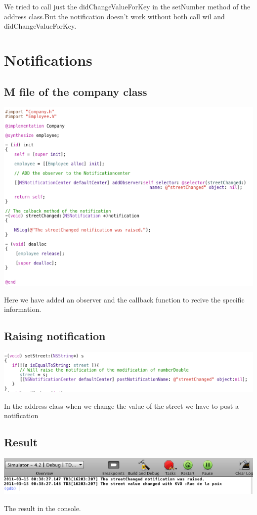 \documentclass[a4paper,10pt]{article}
\begin{document}
			We tried to call just the didChangeValueForKey  in the setNumber method of the  address class.But the notification doesn't work without both call wil and didChangeValueForKey.
			
				\section{ Notifications }
						\subsection{M file of the company class}	
							\begin{center}
							\includegraphics[scale=0.8]{./images/cmpSrc.png}
							\end{center}
						Here we have added an observer and the callback function to recive the specific information.
						
				\subsection{Raising notification }	
					\begin{center}
						 \includegraphics[scale=0.8]{./images/notCall.png}
					\end{center}
					In the address class when we change the value of the street we have to post a notification
					\subsection{Result }	
						\begin{center}
				 \includegraphics[scale=0.8]{./images/reslutNot.png}
						\end{center}
						The result in the console.
				
\end{document}
